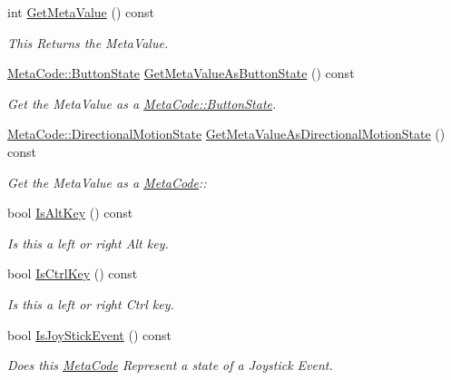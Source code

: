 \begin{DoxyCompactItemize}
int \hyperlink{classMezzanine_1_1MetaCode_a650c4ae1fb698233516d978dd83dfca7}{GetMetaValue} () const 
\begin{DoxyCompactList}\small\item\em This Returns the MetaValue. \item\end{DoxyCompactList}\item 
\hyperlink{classMezzanine_1_1MetaCode_a65b6d86ef846369bd8f3fd944a455fd0}{MetaCode::ButtonState} \hyperlink{classMezzanine_1_1MetaCode_a6b106f781c0f7be4442cf45c7696d339}{GetMetaValueAsButtonState} () const 
\begin{DoxyCompactList}\small\item\em Get the MetaValue as a \hyperlink{classMezzanine_1_1MetaCode_a65b6d86ef846369bd8f3fd944a455fd0}{MetaCode::ButtonState}. \item\end{DoxyCompactList}\item 
\hyperlink{classMezzanine_1_1MetaCode_ad37143a88b8c94cb6b2f40f5d66104ad}{MetaCode::DirectionalMotionState} \hyperlink{classMezzanine_1_1MetaCode_a03033262ac8632a8a7567f7ca0dc9975}{GetMetaValueAsDirectionalMotionState} () const 
\begin{DoxyCompactList}\small\item\em Get the MetaValue as a \hyperlink{classMezzanine_1_1MetaCode}{MetaCode}:: \item\end{DoxyCompactList}\item 
bool \hyperlink{classMezzanine_1_1MetaCode_a330ca2c2cb69c7d0134a842753f6a397}{IsAltKey} () const 
\begin{DoxyCompactList}\small\item\em Is this a left or right Alt key. \item\end{DoxyCompactList}\item 
bool \hyperlink{classMezzanine_1_1MetaCode_af0328602a2dbcc082498f9049b8fd9c5}{IsCtrlKey} () const 
\begin{DoxyCompactList}\small\item\em Is this a left or right Ctrl key. \item\end{DoxyCompactList}\item 
bool \hyperlink{classMezzanine_1_1MetaCode_ab8d13132e795f34367ba3896bf05b5c2}{IsJoyStickEvent} () const 
\begin{DoxyCompactList}\small\item\em Does this \hyperlink{classMezzanine_1_1MetaCode}{MetaCode} Represent a state of a Joystick Event. \item\end{DoxyCompactList}\item 

\end{DoxyCompactItemize}
